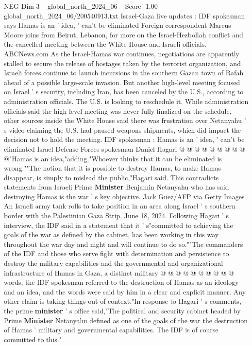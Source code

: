 \begin{textsample}{NEG Dim 3 – global\_north\_2024\_06 – Score -1.00 – global\_north\_2024\_06/200540913.txt}  \label{ex:f3_neg_389}
Israel-Gaza live updates : IDF spokesman says Hamas is an ' idea, ' can't be eliminated Foreign correspondent Marcus Moore joins from Beirut, Lebanon, for more on the Israel-Hezbollah conflict and the cancelled meeting between the White House and Israeli officials.
ABCNews.com As the Israel-Hamas war continues, negotiations are apparently stalled to secure the release of hostages taken by the terrorist organization, and Israeli forces continue to launch incursions in the southern Gazan town of Rafah ahead of a possible large-scale invasion.
But another high-level meeting focused on Israel ' s security, including Iran, has been canceled by the U.S., according to administration officials.
The U.S. is looking to reschedule it.
While administration officials said the high-level meeting was never fully finalized on the schedule, other sources inside the White House said there was frustration over Netanyahu ' s video claiming the U.S. had paused weapons shipments, which did impact the decision not to hold the meeting.
IDF spokesman : Hamas is an ' idea, ' can't be eliminated Israel Defense Forces spokesman Daniel Hagari @ @ @ @ @ @ @ @ @ @"Hamas is an idea,"adding,"Whoever thinks that it can be eliminated is wrong.""The notion that it is possible to destroy Hamas, to make Hamas disappear, is simply to mislead the public,"Hagari said.
This contradicts statements from Israeli Prime \textbf{Minister} Benjamin Netanyahu who has said destroying Hamas is the war ' s key objective.
Jack Guez/AFP via Getty Images An Israeli army tank rolls to take position in an area along Israel ' s southern border with the Palestinian Gaza Strip, June 18, 2024.
Following Hagari ' s interview, the IDF said in a statement that it ' s"committed to achieving the goals of the war as defined by the cabinet, has been working in this way throughout the war day and night and will continue to do so.""The commanders of the IDF and those who serve fight with determination and persistence to destroy the military capabilities and the governmental and organizational infrastructure of Hamas in Gaza, a distinct military @ @ @ @ @ @ @ @ @ @ words, the IDF spokesman referred to the destruction of Hamas as an ideology and an idea, and the words were said by him in a clear and explicit manner.
Any other claim is taking things out of context."In response to Hagari ' s comments, the prime \textbf{minister} ' s office said,"The political and security cabinet headed by Prime \textbf{Minister} Netanyahu defined as one of the goals of the war the destruction of Hamas ' military and governmental capabilities.
The IDF is of course committed to this."

\end{textsample}

